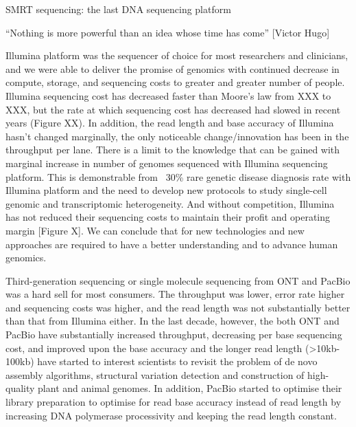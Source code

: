 SMRT sequencing: the last DNA sequencing platform

“Nothing is more powerful than an idea whose time has come” [Victor Hugo]

Illumina platform was the sequencer of choice for most researchers and clinicians, and we were able to deliver the promise of genomics with continued decrease in compute, storage, and sequencing costs to greater and greater number of people. Illumina sequencing cost has decreased faster than Moore’s law from XXX to XXX, but the rate at which sequencing cost has decreased had slowed in recent years (Figure XX). In addition, the read length and base accuracy of Illumina hasn’t changed marginally, the only noticeable change/innovation has been in the throughput per lane. There is a limit to the knowledge that can be gained with marginal increase in number of genomes sequenced with Illumina sequencing platform. This is demonstrable from ~30\% rare genetic disease diagnosis rate with Illumina platform and the need to develop new protocols to study single-cell genomic and transcriptomic heterogeneity. And without competition, Illumina has not reduced their sequencing costs to maintain their profit and operating margin [Figure X]. We can conclude that for new technologies and new approaches are required to have a better understanding and to advance human genomics. 

Third-generation sequencing or single molecule sequencing from ONT and PacBio was a hard sell for most consumers. The throughput was lower, error rate higher and sequencing costs was higher, and the read length was not substantially better than that from Illumina either. In the last decade, however, the both ONT and PacBio have substantially increased throughput, decreasing per base sequencing cost, and improved upon the base accuracy and the longer read length (>10kb-100kb) have started to interest scientists to revisit the problem of de novo assembly algorithms, structural variation detection and construction of high-quality plant and animal genomes. In addition, PacBio started to optimise their library preparation to optimise for read base accuracy instead of read length by increasing DNA polymerase processivity and keeping the read length constant. 


